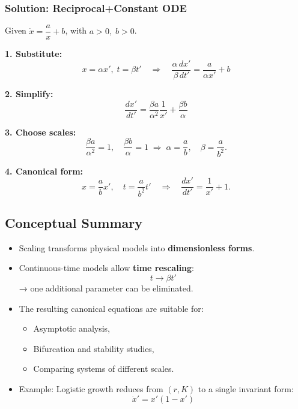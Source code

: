 \documentclass{beamer}
\begin{document}
\begin{frame}
\frametitle{Solution: Reciprocal+Constant ODE}
\small
Given \(\dot x = \dfrac{a}{x} + b\), with \(a>0,\; b>0\).

\textbf{1. Substitute:}
\[
x=\alpha x',\; t=\beta t'
\quad \Rightarrow \quad
\frac{\alpha\,dx'}{\beta\,dt'} = \frac{a}{\alpha x'} + b
\]

\textbf{2. Simplify:}
\[
\frac{dx'}{dt'} = 
\frac{\beta a}{\alpha^{2}}\frac{1}{x'} + \frac{\beta b}{\alpha}
\]

\textbf{3. Choose scales:}
\[
\frac{\beta a}{\alpha^{2}}=1,\quad \frac{\beta b}{\alpha}=1
\;\Rightarrow\;
\alpha = \frac{a}{b},\quad \beta = \frac{a}{b^{2}}.
\]

\textbf{4. Canonical form:}
\[
x=\frac{a}{b}x',\quad t=\frac{a}{b^{2}}t'
\quad \Longrightarrow \quad
\boxed{\frac{dx'}{dt'} = \frac{1}{x'} + 1.}
\]
\end{frame}



\subsection{Conceptual Summary}
\begin{frame}

\begin{itemize}
    \item Scaling transforms physical models into \textbf{dimensionless forms}.
    \item Continuous-time models allow \textbf{time rescaling}:
          \[
          t \to \beta t'
          \]
          → one additional parameter can be eliminated.
    \item The resulting canonical equations are suitable for:
    \begin{itemize}
        \item Asymptotic analysis,
        \item Bifurcation and stability studies,
        \item Comparing systems of different scales.
    \end{itemize}
    \item Example: Logistic growth reduces from $(r,K)$ to a single invariant form:
          \[
          \dot{x}' = x'(1 - x')
          \]
\end{itemize}
\end{frame}
\end{document}

